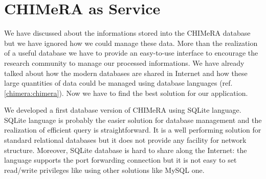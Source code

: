 \documentclass{standalone}
\begin{document}
\section[CHIMeRA as Service]{CHIMeRA as Service}\label{chimera:caas}

We have discussed about the informations stored into the \textsf{CHIMeRA} database but we have ignored how we could manage these data.
More than the realization of a useful database we have to provide an easy-to-use interface to encourage the research community to manage our processed informations.
We have already talked about how the modern databases are shared in Internet and how these large quantities of data could be managed using database languages (ref. \ref{chimera:chimera}).
Now we have to find the best solution for our application.

We developed a first database version of \textsf{CHIMeRA} using \textsf{SQLite} language.
\textsf{SQLite} language is probably the easier solution for database management and the realization of efficient query is straightforward.
It is a well performing solution for standard relational databases but it does not provide any facility for network structure.
Moreover, \textsf{SQLite} database is hard to share along the Internet: the language supports the port forwarding connection but it is not easy to set read/write privileges like using other solutions like \textsf{MySQL} one.
\end{document}
